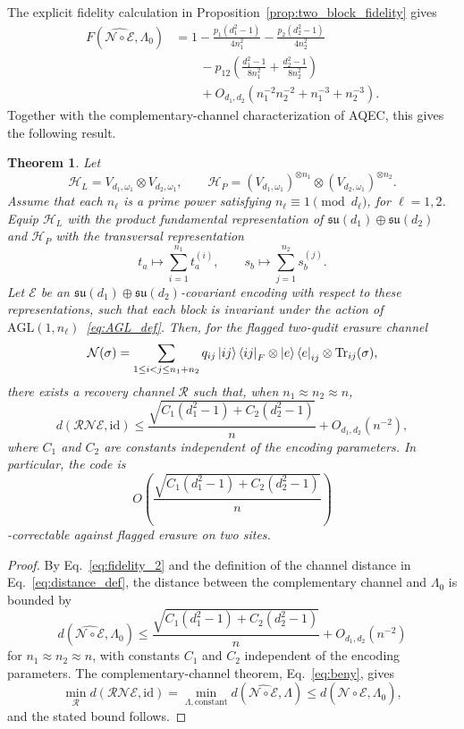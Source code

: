 \documentclass[10pt,twocolumn,superscriptaddress,aps,amsmath,amssymb,citeautoscript,floatfix,prx]{revtex4-2}
\newtheorem{theorem}{Theorem}
\theoremstyle{plain}
\theoremstyle{plain}
\theoremstyle{plain}
\theoremstyle{plain}
\theoremstyle{plain}
\theoremstyle{plain}
\theoremstyle{plain}
\theoremstyle{definition}
\theoremstyle{plain}
\begin{document}
The explicit fidelity calculation in Proposition~\ref{prop:two_block_fidelity} gives
\begin{equation}\label{eq:fidelity_2}
\begin{aligned}
F\left(\widehat{\mathcal N\circ\mathcal E},\Lambda_0\right)
&=
1
-
\frac{p_1(d_1^2-1)}{4n_1^2}
-
\frac{p_2(d_2^2-1)}{4n_2^2}
\\
&\qquad
-
p_{12}
\left(
\frac{d_1^2-1}{8n_1^2}
+
\frac{d_2^2-1}{8n_2^2}
\right)
\\
&\qquad
+
O_{d_1,d_2}\left(n_1^{-2}n_2^{-2}+n_1^{-3}+n_2^{-3}\right).
\end{aligned}
\end{equation}
Together with the complementary-channel characterization of AQEC, this gives the following result.

\begin{theorem}
Let
$$
\mathcal H_L
=
V_{d_1,\omega_1}
\otimes
V_{d_2,\omega_1},
\qquad
\mathcal H_P
=
(V_{d_1,\omega_1})^{\otimes n_1}
\otimes
(V_{d_2,\omega_1})^{\otimes n_2}.
$$
Assume that each $n_\ell$ is a prime power satisfying $n_\ell\equiv 1\pmod{d_\ell}$, for $\ell=1,2$. 
Equip $\mathcal H_L$ with the product fundamental representation of $\mathfrak{su}(d_1)\oplus\mathfrak{su}(d_2)$ and $\mathcal H_P$ with the transversal representation
$$
t_a
\longmapsto
\sum_{i=1}^{n_1} t_a^{(i)},
\qquad
s_b
\longmapsto
\sum_{j=1}^{n_2} s_b^{(j)} .
$$
Let $\mathcal E$ be an $\mathfrak{su}(d_1)\oplus\mathfrak{su}(d_2)$-covariant encoding with respect to these representations, 
such that each block is invariant under the action of $\mathrm{AGL}(1,n_\ell)$~\eqref{eq:AGL_def}. Then, for the flagged two-qudit erasure channel
$$
\mathcal N(\sigma)
=
\sum_{1\le i<j\le n_1+n_2}
q_{ij}
\ket{ij}\bra{ij}_F
\otimes
\ket e\bra e_{ij}
\otimes
\operatorname{Tr}_{ij}(\sigma),
$$
there exists a recovery channel $\mathcal R$ such that, when $n_1\approx n_2\approx n$,
$$
d(\mathcal R\mathcal N\mathcal E,\mathrm{id})
\le
\frac{
\sqrt{
C_1(d_1^2-1)
+
C_2(d_2^2-1)
}
}{n}
+
O_{d_1,d_2}(n^{-2}),
$$
where $C_1$ and $C_2$ are constants independent of the encoding parameters. In particular, the code is
$$
O\left(
\frac{
\sqrt{
C_1(d_1^2-1)
+
C_2(d_2^2-1)
}
}{n}
\right)
$$
-correctable against flagged erasure on two sites.
\end{theorem}

\begin{proof}
By Eq.~\eqref{eq:fidelity_2} and the definition of the channel distance in Eq.~\eqref{eq:distance_def}, 
the distance between the complementary channel and $\Lambda_0$ is bounded by
$$
d\left(\widehat{\mathcal N\circ\mathcal E},\Lambda_0\right)
\le
\frac{
\sqrt{
C_1(d_1^2-1)
+
C_2(d_2^2-1)
}
}{n}
+
O_{d_1,d_2}(n^{-2})
$$
for $n_1\approx n_2\approx n$, with constants $C_1$ and $C_2$ independent of the encoding parameters. The complementary-channel theorem, Eq.~\eqref{eq:beny}, gives
$$
\min_{\mathcal R}
d(\mathcal R\mathcal N\mathcal E,\mathrm{id})
=
\min_{\Lambda,\mathrm{constant}}
d\left(\widehat{\mathcal N\circ\mathcal E},\Lambda\right)
\le
d\left(\widehat{\mathcal N\circ\mathcal E},\Lambda_0\right),
$$
and the stated bound follows.
\end{proof}
\end{document}
